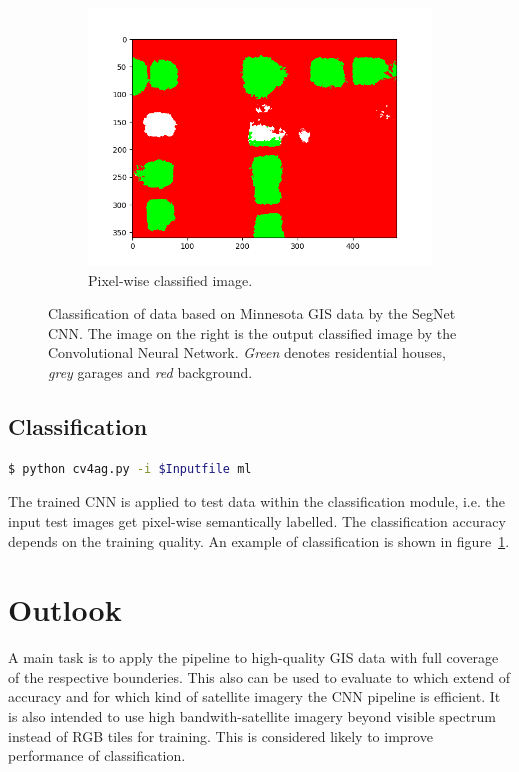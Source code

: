 \documentclass[fleqn,10pt]{SelfArx} %
\begin{document}
\begin{figure}[ht]
\begin{subfigure}{.33\textwidth}
  \includegraphics[width= \linewidth]{minnesota3.png}
  \caption{Pixel-wise classified image.}
\end{subfigure}
\caption{Classification of data based on Minnesota GIS data by the SegNet CNN. The image on the right is the output classified image by the Convolutional Neural Network. \textit{Green} denotes residential houses, \textit{grey} garages and \textit{red} background.}
\label{fig:ex}
\end{figure}
\newpage
\subsection{Classification}
\begin{lstlisting}[language=bash]
  $ python cv4ag.py -i $Inputfile ml
\end{lstlisting}
The trained CNN is applied to test data within the classification module, i.e. the input test images get pixel-wise semantically labelled. The classification accuracy depends on the training quality. An example of classification is shown in figure~\ref{fig:ex}.





\section{Outlook}
A main task is to apply the pipeline to high-quality GIS data with full coverage of the respective bounderies. This also can be used to evaluate to which extend of accuracy and for which kind of satellite imagery the CNN pipeline is efficient. It is also intended to use high bandwith-satellite imagery beyond visible spectrum instead of RGB tiles for training. This is considered likely to improve performance of classification.
\end{document}
